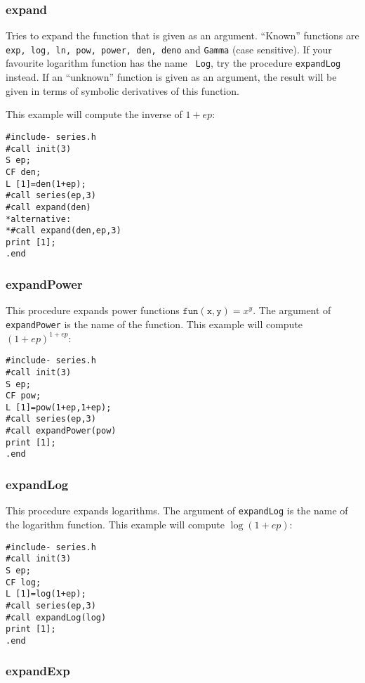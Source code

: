 \documentclass{article}
\begin{document}
\subsubsection{expand}
\label{sec:expand}

Tries to expand the function that is given as an argument. ``Known''
functions are {\tt exp, log, ln, pow, power, den, deno} and {\tt Gamma}
(case sensitive). If your favourite logarithm function has the name {\tt
Log}, try the procedure {\tt expandLog} instead. If an ``unknown''
function is given as an argument, the result will be given in terms of
symbolic derivatives of this function.

This example will compute the
inverse of $1+ep$:
\begin{verbatim}
#include- series.h
#call init(3)
S ep;
CF den;
L [1]=den(1+ep);
#call series(ep,3)
#call expand(den)
*alternative:
*#call expand(den,ep,3)
print [1];
.end
\end{verbatim}

\subsubsection{expandPower}
\label{sec:pow_fun}

This procedure expands power functions $\mathtt{fun(x,y)} = x^y$. The
argument of {\tt expandPower} is the name of the function. This example
will compute $(1+ep)^{1+ep}$:
\begin{verbatim}
#include- series.h
#call init(3)
S ep;
CF pow;
L [1]=pow(1+ep,1+ep);
#call series(ep,3)
#call expandPower(pow)
print [1];
.end
\end{verbatim}

\subsubsection{expandLog}
\label{sec:log_fun}

This procedure expands logarithms. The argument of {\tt expandLog} is the name of the
logarithm function. This example will compute $\log(1+ep)$:
\begin{verbatim}
#include- series.h
#call init(3)
S ep;
CF log;
L [1]=log(1+ep);
#call series(ep,3)
#call expandLog(log)
print [1];
.end
\end{verbatim}

\subsubsection{expandExp}
\label{sec:exp_fun}
\end{document}

